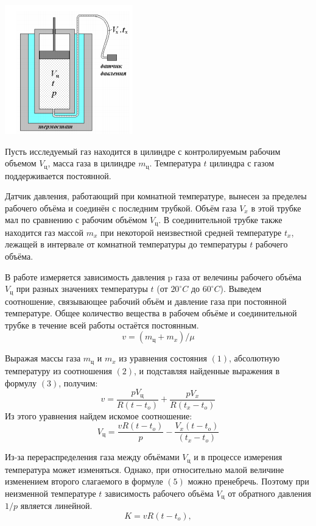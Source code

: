 \documentclass[12pt]{article}
\begin{document}
\begin{center}
\includegraphics{1}
\end{center}
Пусть исследуемый газ находится в цилиндре с контролируемым рабочим объемом $V_{ц}$, масса газа в цилиндре $m_{ц}$. Температура $t$ цилиндра с газом поддерживается постоянной.

Датчик давления, работающий при комнатной температуре, вынесен за пределеы рабочего объёма и соединён с последним трубкой. Объём газа $V_{x}$ в этой трубке мал по сравнению с рабочим объёмом $V_{ц}$. В соединительной трубке также находится газ массой $m_{x}$ при некоторой неизвестной средней температуре $t_{x}$,  лежащей в интервале от комнатной температуры до температуры $t$ рабочего объёма.

В работе измеряется зависимость давления p газа от велечины рабочего объёма $V_{ц}$ при разных значениях температуры $t$ (от $20^{\circ} C$ до  $60^{\circ} C$). Выведем соотношение, связывающее рабочий объём и давление газа при постоянной температуре. Общее количество вещества в рабочем объёме и соединительной трубке в течение всей работы остаётся постоянным.
\begin{equation}
v = (m_{ц}+m_{x})/\mu
\end{equation}			

Выражая массы газа $m_{ц}$ и $m_{x}$ из уравнения состояния $(1)$, абсолютную температуру из соотношения $(2)$, и подставляя найденные выражения в формулу $(3)$, получим:
\begin{equation}
v = \frac{pV_{ц}}{R(t-t_{o})} +\frac{pV_{x}}{R(t_{x}-t_{o})} 
\end{equation}			
Из этого уравнения найдем искомое соотношение:
\begin{equation}
V_{ц} = \frac{vR(t-t_{o})}{p}-\frac{V_{x}(t-t_{o})}{(t_{x}-t_{o})} 
\end{equation}

Из-за перераспределения газа между объёмами $V_{ц}$ и   в процессе измерения температура   может изменяться. Однако, при относительно малой величине   изменением второго слагаемого в формуле $(5)$ можно пренебречь. Поэтому при неизменной температуре $t$ зависимость рабочего объёма $V_{ц}$ от обратного давления $1/p$ является линейной. 
\begin{equation}
K = vR(t-t_{o}),
\end{equation}
\end{document}
